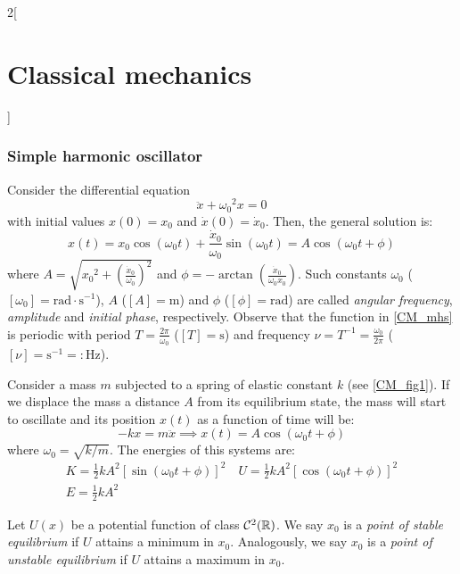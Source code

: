 \documentclass[../../../main_physics.tex]{subfiles}
\begin{document}
\begin{multicols}{2}[\section{Classical mechanics}]
  \subsubsection{Simple harmonic oscillator}
  \begin{proposition}
    Consider the differential equation $$\ddot{x}+{\omega_0}^2 x=0$$ with initial values $x(0)=x_0$ and $\dot{x}(0)=\dot{x}_0$. Then, the general solution is:
    \begin{equation}
      x(t)=x_0\cos(\omega_0t)+\frac{\dot{x}_0}{\omega_0}\sin(\omega_0t)=A\cos(\omega_0t+\phi)
      \label{CM_mhs}
    \end{equation} where $\displaystyle A=\sqrt{{x_0}^2+{\left(\frac{\dot{x}_0}{\omega_0}\right)}^2}$ and $\displaystyle \phi=-\arctan\left(\frac{\dot{x}_0}{\omega_0x_0}\right)$. Such constants $\omega_0$ ($[\omega_0]=\text{rad}\cdot \text{s}^{-1}$), $A$ ($[A]=\text{m}$) and $\phi$ ($[\phi]=\text{rad}$) are called \emph{angular frequency}, \emph{amplitude} and \emph{initial phase}, respectively. Observe that the function in \cref{CM_mhs} is periodic with period $T=\frac{2\pi}{\omega_0}$ ($[T]=\text{s}$) and frequency $\nu=T^{-1}=\frac{\omega_0}{2\pi}$ ($[\nu]=\text{s}^{-1}=:\text{Hz}$).
  \end{proposition}
  \begin{proposition}
    Consider a mass $m$ subjected to a spring of elastic constant $k$ (see \cref{CM_fig1}). If we displace the mass a distance $A$ from its equilibrium state, the mass will start to oscillate and its position $x(t)$ as a function of time will be:
    $$-kx=m\ddot{x}\implies x(t)=A\cos(\omega_0t+\phi)$$ where $\omega_0=\sqrt{k/m}$. The energies of this systems are:
    \begin{gather*}
      K=\frac{1}{2}kA^2{\left[\sin(\omega_0 t+\phi)\right]}^2\quad U=\frac{1}{2}kA^2{\left[\cos(\omega_0 t+\phi)\right]}^2\\
      E=\frac{1}{2}kA^2
    \end{gather*}
    \begin{center}
      \begin{minipage}{\linewidth}
        \centering
        
        \label{CM_fig1}
      \end{minipage}
    \end{center}
  \end{proposition}
  \begin{definition}
    Let $U(x)$ be a potential function of class $\mathcal{C}^2(\mathbb{R})$. We say $x_0$ is a \emph{point of stable equilibrium} if $U$ attains a minimum in $x_0$. Analogously, we say $x_0$ is a \emph{point of unstable equilibrium} if $U$ attains a maximum in $x_0$.

\end{definition}
\end{multicols}
\end{document}
